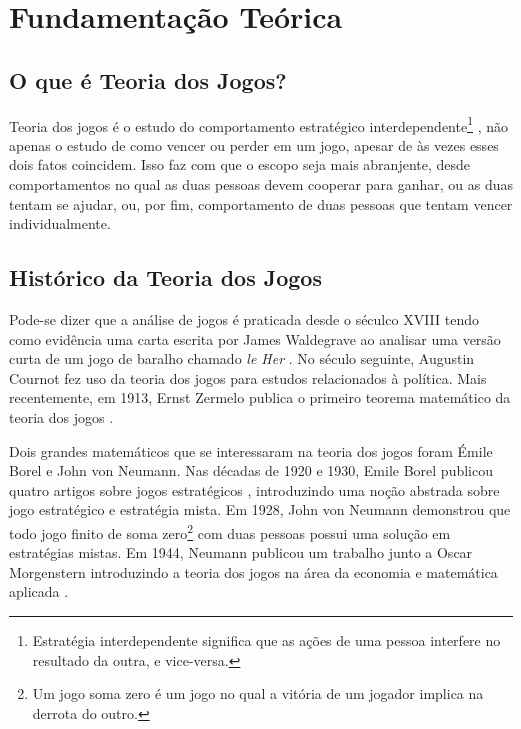 \chapter[Fundamentação Teórica]{Fundamentação Teórica}
\label{cha:fundamentacao-teorica}

\section{O que é Teoria dos Jogos?}
\label{sec:o-que-e-teoria-dos-jogos}

Teoria dos jogos é o estudo do comportamento estratégico interdependente\footnote{Estratégia interdependente significa que as ações de uma pessoa interfere no resultado da outra, e vice-versa.} \cite{spaniel_2011}, não apenas o estudo de como vencer ou perder em um jogo, apesar de às vezes esses dois fatos coincidem. Isso faz com que o escopo seja mais abranjente, desde comportamentos no qual as duas pessoas devem cooperar para ganhar, ou as duas tentam se ajudar, ou, por fim, comportamento de duas pessoas que tentam vencer individualmente.

\section{Histórico da Teoria dos Jogos}
\label{sec:historico-da-teoria-dos-jogos}

Pode-se dizer que a análise de jogos é praticada desde o séculco XVIII tendo como evidência uma carta escrita por James Waldegrave ao analisar uma versão curta de um jogo de baralho chamado \emph{le Her} \cite[p.~2]{Prague_severalmilestones}.%
No século seguinte, Augustin Cournot fez uso da teoria dos jogos para estudos relacionados à política. Mais recentemente, em 1913, Ernst Zermelo publica o primeiro teorema matemático da teoria dos jogos \cite[p.~2]{sartini_IIbienaldasbm}.

Dois grandes matemáticos que se interessaram na teoria dos jogos foram Émile Borel e John von Neumann. Nas décadas de 1920 e 1930, Emile Borel publicou quatro artigos sobre jogos estratégicos \cite[p.~2]{Prague_severalmilestones}, introduzindo uma noção abstrada sobre jogo estratégico e estratégia mista. Em 1928, John von Neumann demonstrou que todo jogo finito de soma zero\footnote{Um jogo soma zero é um jogo no qual a vitória de um jogador implica na derrota do outro.} com duas pessoas possui uma solução em estratégias mistas. Em 1944, Neumann publicou um trabalho junto a Oscar Morgenstern introduzindo a teoria dos jogos na área da economia e matemática aplicada \cite[p.~2--3]{sartini_IIbienaldasbm}.

